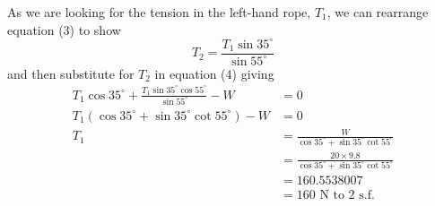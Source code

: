 \documentclass[a4paper,12pt]{article}
\numberwithin{equation}{section}
\begin{document}
\begin{question}
As we are looking for the tension in the left-hand rope, $T_1$, we can rearrange equation (3) to show
\[T_2=\frac{T_1\sin{35^\circ}}{\sin{55^\circ}}\]
and then substitute for $T_2$ in equation (4) giving
\begin{align*}
T_1\cos{35^\circ}+\frac{T_1\sin{35^\circ}\cos{55^\circ}}{\sin{55^\circ}}-W&=0\\
T_1(\cos{35^\circ}+\sin{35^\circ}\cot{55^\circ})-W&=0\\
T_1&=\frac{W}{\cos{35^\circ}+\sin{35^\circ}\cot{55^\circ}}\\
&=\frac{20\times9.8}{\cos{35^\circ}+\sin{35^\circ}\cot{55^\circ}}\\
&=160.5538007\\
&=160\text{ N to 2 s.f.}
\end{align*}
\end{question}
\end{document}

